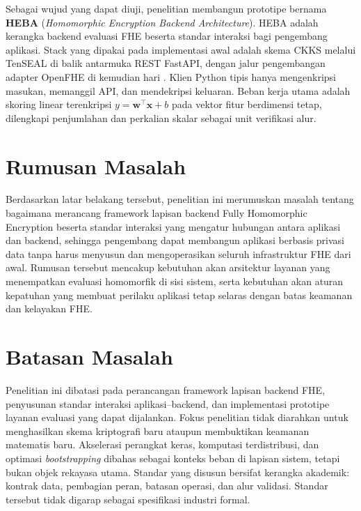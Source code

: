 \documentclass[12pt,a4paper,oneside]{report}
\begin{document}
Sebagai wujud yang dapat diuji, penelitian membangun prototipe bernama \textbf{HEBA} (\emph{Homomorphic Encryption Backend Architecture}). HEBA adalah kerangka backend evaluasi FHE beserta standar interaksi bagi pengembang aplikasi. Stack yang dipakai pada implementasi awal adalah skema CKKS melalui TenSEAL di balik antarmuka REST FastAPI, dengan jalur pengembangan adapter OpenFHE di kemudian hari \cite{benaissa2021tenseal,badawi2022openfhe,brynds2025cryptoracle}. Klien Python tipis hanya mengenkripsi masukan, memanggil API, dan mendekripsi keluaran. Beban kerja utama adalah skoring linear terenkripsi $y=\mathbf{w}^{\top}\mathbf{x}+b$ pada vektor fitur berdimensi tetap, dilengkapi penjumlahan dan perkalian skalar sebagai unit verifikasi alur.

\section{Rumusan Masalah}

Berdasarkan latar belakang tersebut, penelitian ini merumuskan masalah tentang bagaimana merancang framework lapisan backend Fully Homomorphic Encryption beserta standar interaksi yang mengatur hubungan antara aplikasi dan backend, sehingga pengembang dapat membangun aplikasi berbasis privasi data tanpa harus menyusun dan mengoperasikan seluruh infrastruktur FHE dari awal. Rumusan tersebut mencakup kebutuhan akan arsitektur layanan yang menempatkan evaluasi homomorfik di sisi sistem, serta kebutuhan akan aturan kepatuhan yang membuat perilaku aplikasi tetap selaras dengan batas keamanan dan kelayakan FHE.

\section{Batasan Masalah}

Penelitian ini dibatasi pada perancangan framework lapisan backend FHE, penyusunan standar interaksi aplikasi--backend, dan implementasi prototipe layanan evaluasi yang dapat dijalankan. Fokus penelitian tidak diarahkan untuk menghasilkan skema kriptografi baru ataupun membuktikan keamanan matematis baru. Akselerasi perangkat keras, komputasi terdistribusi, dan optimasi \emph{bootstrapping} dibahas sebagai konteks beban di lapisan sistem, tetapi bukan objek rekayasa utama. Standar yang disusun bersifat kerangka akademik: kontrak data, pembagian peran, batasan operasi, dan alur validasi. Standar tersebut tidak digarap sebagai spesifikasi industri formal.
\end{document}
